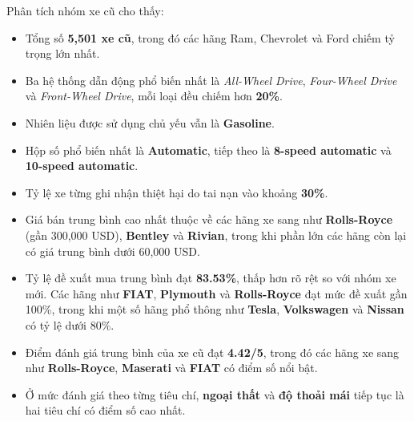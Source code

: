 \noindent Phân tích nhóm xe cũ cho thấy:
\begin{itemize}
    \item Tổng số \textbf{5,501 xe cũ}, trong đó các hãng Ram, Chevrolet và Ford chiếm tỷ trọng lớn nhất.
    \item Ba hệ thống dẫn động phổ biến nhất là \textit{All-Wheel Drive}, \textit{Four-Wheel Drive} và \textit{Front-Wheel Drive}, mỗi loại đều chiếm hơn \textbf{20\%}.
    \item Nhiên liệu được sử dụng chủ yếu vẫn là \textbf{Gasoline}.
    \item Hộp số phổ biến nhất là \textbf{Automatic}, tiếp theo là \textbf{8-speed automatic} và \textbf{10-speed automatic}.
    \item Tỷ lệ xe từng ghi nhận thiệt hại do tai nạn vào khoảng \textbf{30\%}.
    \item Giá bán trung bình cao nhất thuộc về các hãng xe sang như \textbf{Rolls-Royce} (gần 300,000 USD), \textbf{Bentley} và \textbf{Rivian}, trong khi phần lớn các hãng còn lại có giá trung bình dưới 60,000 USD.
    \item Tỷ lệ đề xuất mua trung bình đạt \textbf{83.53\%}, thấp hơn rõ rệt so với nhóm xe mới. Các hãng như \textbf{FIAT}, \textbf{Plymouth} và \textbf{Rolls-Royce} đạt mức đề xuất gần 100\%, trong khi một số hãng phổ thông như \textbf{Tesla}, \textbf{Volkswagen} và \textbf{Nissan} có tỷ lệ dưới 80\%.
    \item Điểm đánh giá trung bình của xe cũ đạt \textbf{4.42/5}, trong đó các hãng xe sang như \textbf{Rolls-Royce}, \textbf{Maserati} và \textbf{FIAT} có điểm số nổi bật.
    \item Ở mức đánh giá theo từng tiêu chí, \textbf{ngoại thất} và \textbf{độ thoải mái} tiếp tục là hai tiêu chí có điểm số cao nhất.
\end{itemize}
